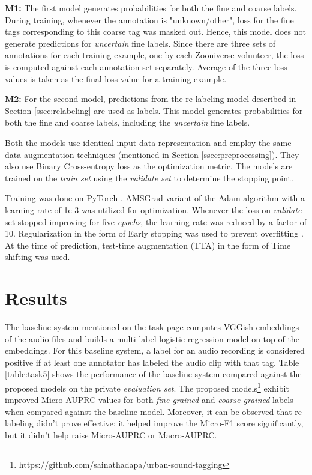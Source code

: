 \documentclass{article}
\begin{document}
\begin{sloppy}
\textbf{M1:} The first model generates probabilities for both the fine and coarse labels. During training, whenever the annotation is "unknown/other", loss for the fine tags corresponding to this coarse tag was masked out. Hence, this model does not generate predictions for \textit{uncertain} fine labels. Since there are three sets of annotations for each training example, one by each Zooniverse volunteer, the loss is computed against each annotation set separately. Average of the three loss values is taken as the final loss value for a training example.

\textbf{M2:} For the second model, predictions from the re-labeling model described in Section \ref{ssec:relabeling} are used as labels. This model generates probabilities for both the fine and coarse labels, including the \textit{uncertain} fine labels.

Both the models use identical input data representation and employ the same data augmentation techniques (mentioned in Section \ref{ssec:preprocessing}). They also use Binary Cross-entropy loss as the optimization metric. The models are trained on the \textit{train set} using the \textit{validate set} to determine the stopping point.

Training was done on PyTorch \cite{paszke2017automatic}. AMSGrad variant of the Adam algorithm \cite{kingma2014adam, reddi2019convergence} with a learning rate of 1e-3 was utilized for optimization. Whenever the loss on \textit{validate} set stopped improving for five \textit{epochs}, the learning rate was reduced by a factor of 10. Regularization in the form of Early stopping was used to prevent overfitting \cite{prechelt1998early}. At the time of prediction, test-time augmentation (TTA) in the form of Time shifting was used.

\section{Results}
\label{sec:results}

The baseline system mentioned on the task page \cite{dcase2019task5} computes VGGish embeddings \cite{hershey2017cnn} of the audio files and builds a multi-label logistic regression model on top of the embeddings. For this baseline system, a label for an audio recording is considered positive if at least one annotator has labeled the audio clip with that tag. Table \ref{table:task5} shows the performance of the baseline system compared against the proposed models on the private \textit{evaluation set}. The proposed models\footnote{https://github.com/sainathadapa/urban-sound-tagging} exhibit improved Micro-AUPRC values for both \textit{fine-grained} and \textit{coarse-grained} labels when compared against the baseline model. Moreover, it can be observed that re-labeling didn't prove effective; it helped improve the Micro-F1 score significantly, but it didn't help raise Micro-AUPRC or Macro-AUPRC.


\end{sloppy}
\end{document}
